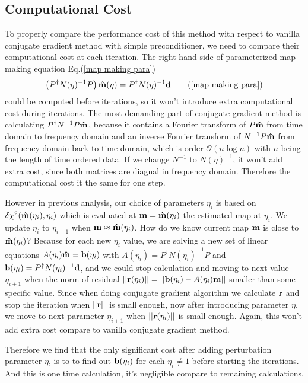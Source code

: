 \documentclass[11pt, letterpaper]{article}
\newcommand{\vbd}{\vb{d}}
\newcommand{\vbm}{\vb{m}}
\newcommand{\vbb}{\vb{b}}
\newcommand{\inv}[1]{#1^{-1}}
\newcommand{\hatm}{\vb{\hat{m}}}
\newcommand{\Pdagger}{P^{\dagger}}
\begin{document}
\subsection{Computational Cost}
To properly compare the performance cost of this method with respect to vanilla
conjugate gradient method with simple preconditioner,
we need to compare their computational cost at each iteration.
The right hand side of parameterized map making equation
Eq.(\ref{map making para})
\begin{align}
\qty(\Pdagger \inv{N(\eta)} P)\, \hatm(\eta) 
= \Pdagger \inv{N(\eta)} \vbd \tag{\ref{map making para}}
\end{align}
could be computed before iterations,
so it won't introduce extra computational cost during iterations.
The most demanding part of conjugate gradient method is calculating
$\Pdagger \inv{N} P \hatm$, because it contains a Fourier transform of
$P\hatm$ from time domain to frequency domain and an inverse Fourier transform
of $\inv{N} P \hatm$ from frequency domain back to time domain,
which is order $\mathcal{O}(n\log n)$ with $n$ being the length of time ordered
data.
If we change $\inv{N}$ to $\inv{N(\eta)}$, it won't add extra cost,
since both matrices are diagnal in frequency domain.
Therefore the computational cost it the same for one step.

However in previous analysis, our choice of parameters $\eta_i$ is based on
$\delta\chi^2(\hatm(\eta_i), \eta_i)$ which is evaluated at 
$\vbm = \hatm(\eta_i)$ the estimated map at $\eta_i$.
We update $\eta_i$ to $\eta_{i+1}$ when $\vbm \approx \hatm(\eta_i)$. 
How do we know current map $\vbm$ is close to $\hatm(\eta_i)$? 
Because for each new $\eta_i$ value, we are solving a new set of linear
equations $A(\eta_i) \hatm = \vbb(\eta_i)$ with
$A(\eta_i) = \Pdagger \inv{N(\eta_i)} P$ and 
$\vbb(\eta_i) = \Pdagger \inv{N(\eta_i)} \vbd$,
and we could stop calculation and moving to next value $\eta_{i+1}$ when the 
norm of residual 
$\qty||\vb{r}(\eta_i)|| = \qty||\vbb(\eta_i) - A(\eta_i) \vbm||$
smaller than some specific value.
Since when doing conjugate gradient algorithm we calculate $\vb{r}$ and stop
the iteration when $\qty||\vb{r}||$ is small enough, now after introducing
parameter $\eta$, we move to next parameter $\eta_{i+1}$ when 
$\qty||\vb{r}(\eta_i)||$ is small enough.
Again, this won't add extra cost compare to vanilla conjugate gradient method.

Therefore we find that the only significant cost after adding perturbation
parameter $\eta$, is to to find out $\vb{b}(\eta_i)$ for each $\eta_i\neq1$
before starting the iterations.
And this is one time calculation, it's negligible compare to remaining
calculations.
\end{document}
